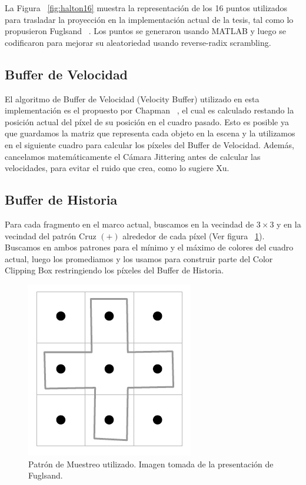 \documentclass[pregrado]{tesis-usb} %
\begin{document}
La Figura ~\ref{fig:halton16} muestra la representación de los 16 puntos utilizados para trasladar la proyección en la implementación actual de la tesis, tal como lo propusieron Fuglsand ~\cite{Fuglsand2016}. Los puntos se generaron usando MATLAB y luego se codificaron para mejorar su aleatoriedad usando reverse-radix scrambling.

\subsection{Buffer de Velocidad}
El algoritmo de Buffer de Velocidad (Velocity Buffer) utilizado en esta implementación es el propuesto por Chapman ~\cite{Chapman2012}, el cual es calculado restando la posición actual del píxel de su posición en el cuadro pasado. Esto es posible ya que guardamos la matriz que representa cada objeto en la escena y la utilizamos en el siguiente cuadro para calcular los píxeles del Buffer de Velocidad. Además, cancelamos matemáticamente el Cámara Jittering antes de calcular las velocidades, para evitar el ruido que crea, como lo sugiere Xu. ~\cite{XU2016}


\subsection{Buffer de Historia}
Para cada fragmento en el marco actual, buscamos en la vecindad de $3\times 3$ y en la vecindad del patrón Cruz $(+)$ alrededor de cada píxel (Ver figura ~\ref{fig:samplingpattern}). Buscamos en ambos patrones para el mínimo y el máximo de colores del cuadro actual, luego los promediamos y los usamos para construir parte del Color Clipping Box restringiendo los píxeles del Buffer de Historia. ~\cite{Fuglsand2016}
\begin{figure}[!hbt]
	\centering
	\includegraphics[scale=0.8]{images/sampling_pattern.png}
	\caption{Patrón de Muestreo utilizado. Imagen tomada de la presentación de Fuglsand. \protect\cite{Fuglsand2016}}\label{fig:samplingpattern}
\end{figure}
\end{document}
